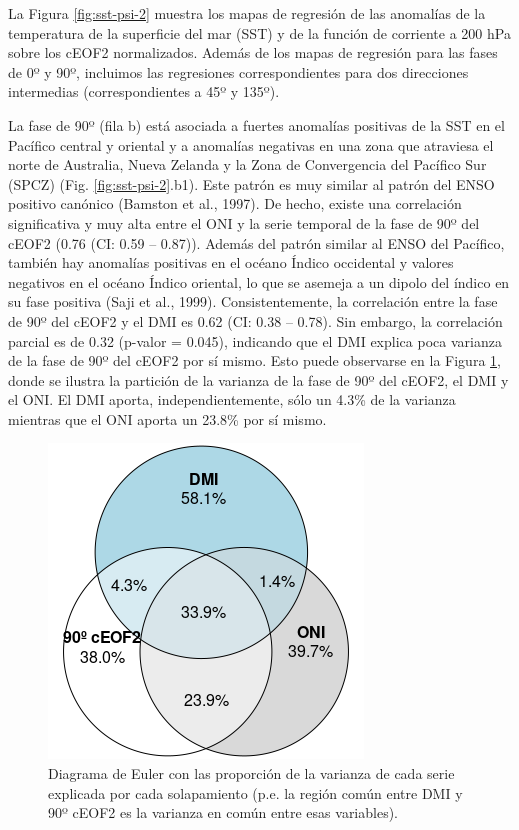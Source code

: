 \documentclass[12pt,oneside]{reedthesis}
\begin{document}
La Figura \ref{fig:sst-psi-2} muestra los mapas de regresión de las anomalías de la temperatura de la superficie del mar (SST) y de la función de corriente a 200 hPa sobre los cEOF2 normalizados.
Además de los mapas de regresión para las fases de 0º y 90º, incluimos las regresiones correspondientes para dos direcciones intermedias (correspondientes a 45º y 135º).

La fase de 90º (fila b) está asociada a fuertes anomalías positivas de la SST en el Pacífico central y oriental y a anomalías negativas en una zona que atraviesa el norte de Australia, Nueva Zelanda y la Zona de Convergencia del Pacífico Sur (SPCZ) (Fig. \ref{fig:sst-psi-2}.b1).
Este patrón es muy similar al patrón del ENSO positivo canónico (Bamston et al., 1997).
De hecho, existe una correlación significativa y muy alta entre el ONI y la serie temporal de la fase de 90º del cEOF2 (0.76 (CI: 0.59 -- 0.87)).
Además del patrón similar al ENSO del Pacífico, también hay anomalías positivas en el océano Índico occidental y valores negativos en el océano Índico oriental, lo que se asemeja a un dipolo del índico en su fase positiva (Saji et al., 1999).
Consistentemente, la correlación entre la fase de 90º del cEOF2 y el DMI es 0.62 (CI: 0.38 -- 0.78).
Sin embargo, la correlación parcial es de 0.32 (p-valor = 0.045), indicando que el DMI explica poca varianza de la fase de 90º del cEOF2 por sí mismo.
Esto puede observarse en la Figura \ref{fig:euler}, donde se ilustra la partición de la varianza de la fase de 90º del cEOF2, el DMI y el ONI.
El DMI aporta, independientemente, sólo un 4.3\% de la varianza mientras que el ONI aporta un 23.8\% por sí mismo.



\begin{figure}
\includegraphics{figures/20-ceofs/euler-1} \caption{Diagrama de Euler con las proporción de la varianza de cada serie explicada por cada solapamiento (p.e. la región común entre DMI y 90º cEOF2 es la varianza en común entre esas variables).}\label{fig:euler}
\end{figure}
\end{document}

